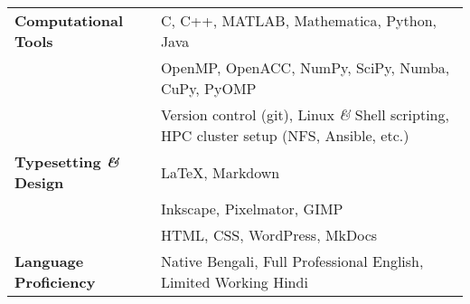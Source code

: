 \begin{longtable}[l]{@{} m{4.75cm} m{15cm}}
\textbf{Computational Tools} & C, C++, MATLAB, Mathematica, Python, Java\\
                                  & OpenMP, OpenACC, NumPy, SciPy, Numba, CuPy, PyOMP\\
                                  & Version control (git), Linux \textit{\&} Shell scripting, HPC cluster setup (NFS, Ansible, etc.)\\[0.2cm]

\textbf{Typesetting \textit{\&} Design}  & \LaTeX, Markdown \\
                                  & Inkscape, Pixelmator, GIMP\\
                                  & HTML, CSS, WordPress, MkDocs \\[0.2cm]
                                                            
\textbf{Language Proficiency} & Native Bengali, Full Professional English,  Limited Working Hindi\\                                               
\end{longtable}